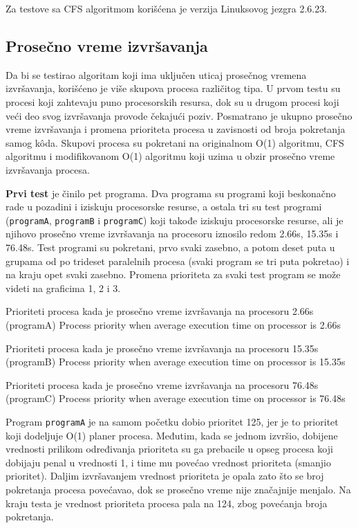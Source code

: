 Za testove sa CFS algoritmom korišćena je verzija Linuksovog jezgra 2.6.23.

\subsection{Prosečno vreme izvršavanja}

Da bi se testirao algoritam koji ima uključen uticaj prosečnog vremena izvršavanja, korišćeno
je više skupova procesa različitog tipa. U prvom testu su procesi koji zahtevaju puno
procesorskih resursa, dok su u drugom procesi koji veći deo svog izvršavanja provode
čekajući poziv. Posmatrano je ukupno prosečno vreme izvršavanja i promena prioriteta
procesa u zavisnosti od broja pokretanja samog kôda. Skupovi procesa su pokretani na
originalnom O(1) algoritmu, CFS algoritmu i modifikovanom O(1) algoritmu koji uzima u
obzir prosečno vreme izvršavanja procesa.

\textbf{Prvi test} je činilo pet programa. Dva programa su programi koji beskonačno rade u pozadini
i iziskuju procesorske resurse, a ostala tri su test programi (\texttt{programA}, \texttt{programB} i
\texttt{programC}) koji takođe iziskuju procesorske resurse, ali je njihovo prosečno vreme
izvršavanja na procesoru iznosilo redom 2.66s, 15.35s i 76.48s. Test programi su pokretani,
prvo svaki zasebno, a potom deset puta u grupama od po trideset paralelnih procesa (svaki
program se tri puta pokretao) i na kraju opet svaki zasebno. Promena prioriteta za svaki test
program se može videti na graficima 1, 2 i 3.


    {Prioriteti procesa kada je prosečno vreme izvršavanja na procesoru 2.66s (programA)}
    {Process priority when average execution time on processor is 2.66s}


    {Prioriteti procesa kada je prosečno vreme izvršavanja na procesoru 15.35s (programB)}
    {Process priority when average execution time on processor is 15.35s}

    {Prioriteti procesa kada je prosečno vreme izvršavanja na procesoru 76.48s (programC)}
    {Process priority when average execution time on processor is 76.48s}

Program \texttt{programA} je na samom početku dobio prioritet 125, jer je to prioritet koji
dodeljuje O(1) planer procesa. Međutim, kada se jednom izvršio, dobijene vrednosti prilikom
određivanja prioriteta su ga prebacile u opseg procesa koji dobijaju penal u vrednosti 1, i time
mu povećao vrednost prioriteta (smanjio prioritet). Daljim izvršavanjem vrednost prioriteta je
opala zato što se broj pokretanja procesa povećavao, dok se prosečno vreme nije značajnije
menjalo. Na kraju testa je vrednost prioriteta procesa pala na 124, zbog povećanja broja
pokretanja.

